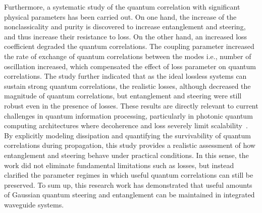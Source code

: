 Furthermore, a systematic study of the quantum correlation with significant physical parameters has been carried out. On one hand, the increase of the nonclassicality and purity is discovered to increase entanglement and steering, and thus increase their resistance to loss. On the other hand, an increased loss coefficient degraded the quantum correlations. The coupling parameter increased the rate of exchange of quantum correlations between the modes i.e., number of oscillation increased, which  compensated the effect of loss parameter on quantum correlations.
The study further indicated that as the ideal lossless systems can sustain strong quantum correlations, the realistic losses, although decreased the magnitude of quantum correlations, but entanglement and steering were still robust even in the presence of losses.
These results are directly relevant to current challenges in quantum information processing, particularly in photonic quantum computing architectures where decoherence and loss severely limit scalability~\cite{Weedbrook2012,Kogias2015,Seifoory2019}. By explicitly modeling dissipation and quantifying the survivability of quantum correlations during propagation, this study provides a realistic assessment of how entanglement and steering behave under practical conditions. In this sense, the work did not eliminate fundamental limitations such as losses, but instead clarified the parameter regimes in which useful quantum correlations can still be preserved.
To sum up, this research work has demonstrated that useful amounts of Gaussian quantum steering and entanglement can be maintained in integrated waveguide systems.